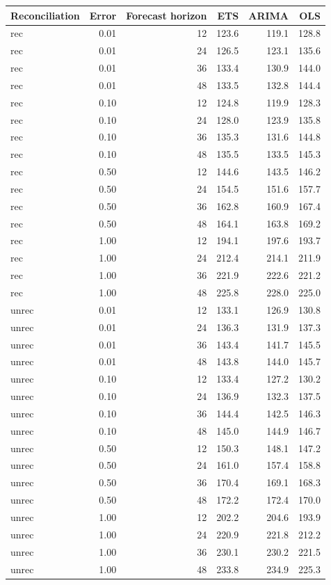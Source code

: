 \documentclass[11pt,a4paper,]{article}
\let\origtable\table
\let\endorigtable\endtable
\renewenvironment{table}[1][2] {
    \expandafter\origtable\expandafter[!htbp]
} {
    \endorigtable
}
\begin{document}
\begin{table}[!h]

\caption{\label{tab:TourismdatasimfixnoiseFH}Mean(RMSE) on one to four year test set with different error levels for ETS, ARIMA and OLS with and without reconciliation - Fixed origin - 304 bottom level series and 8 levels of hierarchy - Simulated tourism dataset}
\centering
\begin{tabular}[t]{lrrrrr}
\toprule
Reconciliation & Error & Forecast horizon & ETS & ARIMA & OLS\\
\midrule
rec & 0.01 & 12 & 123.6 & 119.1 & 128.8\\
rec & 0.01 & 24 & 126.5 & 123.1 & 135.6\\
rec & 0.01 & 36 & 133.4 & 130.9 & 144.0\\
rec & 0.01 & 48 & 133.5 & 132.8 & 144.4\\
rec & 0.10 & 12 & 124.8 & 119.9 & 128.3\\
rec & 0.10 & 24 & 128.0 & 123.9 & 135.8\\
rec & 0.10 & 36 & 135.3 & 131.6 & 144.8\\
rec & 0.10 & 48 & 135.5 & 133.5 & 145.3\\
rec & 0.50 & 12 & 144.6 & 143.5 & 146.2\\
rec & 0.50 & 24 & 154.5 & 151.6 & 157.7\\
rec & 0.50 & 36 & 162.8 & 160.9 & 167.4\\
rec & 0.50 & 48 & 164.1 & 163.8 & 169.2\\
rec & 1.00 & 12 & 194.1 & 197.6 & 193.7\\
rec & 1.00 & 24 & 212.4 & 214.1 & 211.9\\
rec & 1.00 & 36 & 221.9 & 222.6 & 221.2\\
rec & 1.00 & 48 & 225.8 & 228.0 & 225.0\\
unrec & 0.01 & 12 & 133.1 & 126.9 & 130.8\\
unrec & 0.01 & 24 & 136.3 & 131.9 & 137.3\\
unrec & 0.01 & 36 & 143.4 & 141.7 & 145.5\\
unrec & 0.01 & 48 & 143.8 & 144.0 & 145.7\\
unrec & 0.10 & 12 & 133.4 & 127.2 & 130.2\\
unrec & 0.10 & 24 & 136.9 & 132.3 & 137.5\\
unrec & 0.10 & 36 & 144.4 & 142.5 & 146.3\\
unrec & 0.10 & 48 & 145.0 & 144.9 & 146.7\\
unrec & 0.50 & 12 & 150.3 & 148.1 & 147.2\\
unrec & 0.50 & 24 & 161.0 & 157.4 & 158.8\\
unrec & 0.50 & 36 & 170.4 & 169.1 & 168.3\\
unrec & 0.50 & 48 & 172.2 & 172.4 & 170.0\\
unrec & 1.00 & 12 & 202.2 & 204.6 & 193.9\\
unrec & 1.00 & 24 & 220.9 & 221.8 & 212.2\\
unrec & 1.00 & 36 & 230.1 & 230.2 & 221.5\\
unrec & 1.00 & 48 & 233.8 & 234.9 & 225.3\\
\bottomrule
\end{tabular}
\end{table}
\end{document}
